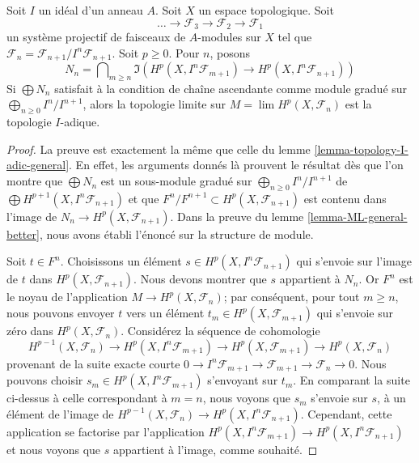\begin{lemma}

\label{lemma-topology-I-adic-general-better}
Soit $I$ un idéal d'un anneau $A$. Soit $X$ un espace topologique. Soit $$
\ldots \to \mathcal{F}_3 \to \mathcal{F}_2 \to \mathcal{F}_1
$$ un système projectif de faisceaux de $A$-modules sur $X$ tel que $\mathcal{F}_n = \mathcal{F}_{n + 1}/I^n\mathcal{F}_{n + 1}$. Soit $p \geq 0$. Pour $n$, posons $$
N_n =
\bigcap\nolimits_{m \geq n}
\Im\left(
H^p(X, I^n\mathcal{F}_{m + 1}) \to H^p(X, I^n\mathcal{F}_{n + 1})
\right)
$$ Si $\bigoplus N_n$ satisfait à la condition de chaîne ascendante comme module gradué sur $\bigoplus_{n \geq 0} I^n/I^{n + 1}$, alors la topologie limite sur $M = \lim H^p(X, \mathcal{F}_n)$ est la topologie $I$-adique.
\end{lemma}

\begin{proof}
La preuve est exactement la même que celle du lemme \ref{lemma-topology-I-adic-general}. En effet, les arguments donnés là prouvent le résultat dès que l'on montre que $\bigoplus N_n$ est un sous-module gradué sur $\bigoplus_{n \geq 0} I^n/I^{n + 1}$ de $\bigoplus H^{p + 1}(X, I^n\mathcal{F}_{n + 1})$ et que $F^n/F^{n + 1} \subset H^p(X, \mathcal{F}_{n + 1})$ est contenu dans l'image de $N_n \to H^p(X, \mathcal{F}_{n + 1})$. Dans la preuve du lemme \ref{lemma-ML-general-better}, nous avons établi l'énoncé sur la structure de module.

\medskip\noindent

Soit $t \in F^n$. Choisissons un élément $s \in H^p(X, I^n\mathcal{F}_{n + 1})$
qui s'envoie sur l'image de $t$ dans $H^p(X, \mathcal{F}_{n + 1})$. Nous devons montrer que $s$ appartient à $N_n$. Or $F^n$ est le noyau de l'application
$M \to H^p(X, \mathcal{F}_n)$; par conséquent, pour tout $m \geq n$, nous pouvons envoyer $t$
vers un élément $t_m \in H^p(X, \mathcal{F}_{m + 1})$ qui s'envoie sur zéro dans $H^p(X, \mathcal{F}_n)$. Considérez la séquence de cohomologie
$$
H^{p - 1}(X, \mathcal{F}_n) \to
H^p(X, I^n\mathcal{F}_{m + 1}) \to
H^p(X, \mathcal{F}_{m + 1}) \to
H^p(X, \mathcal{F}_n)
$$
provenant de la suite exacte courte
$0 \to I^n\mathcal{F}_{m + 1} \to \mathcal{F}_{m + 1} \to \mathcal{F}_n \to 0$. Nous pouvons choisir $s_m \in H^p(X, I^n\mathcal{F}_{m + 1})$ s'envoyant sur $t_m$. En comparant la suite ci-dessus à celle correspondant à $m = n$, nous voyons que
$s_m$ s'envoie sur $s$, à un élément de l'image de
$H^{p - 1}(X, \mathcal{F}_n) \to H^p(X, I^n\mathcal{F}_{n + 1})$. Cependant, cette application se factorise par l'application
$H^p(X, I^n\mathcal{F}_{m + 1}) \to H^p(X, I^n\mathcal{F}_{n + 1})$
et nous voyons que $s$ appartient à l'image, comme souhaité.

\end{proof}





